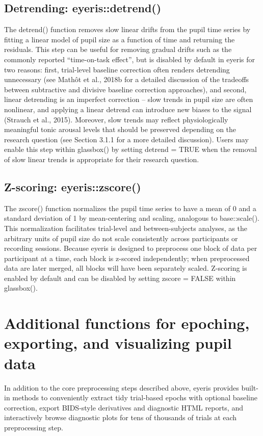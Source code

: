 \subsection{Detrending: eyeris::detrend()}
The detrend() function removes slow linear drifts from the pupil time series by fitting a linear model of pupil size as a function of time and returning the residuals. This step can be useful for removing gradual drifts such as the commonly reported “time-on-task effect”, but is disabled by default in eyeris for two reasons: first, trial-level baseline correction often renders detrending unnecessary (see Mathôt et al., 2018b for a detailed discussion of the tradeoffs between subtractive and divisive baseline correction approaches), and second, linear detrending is an imperfect correction – slow trends in pupil size are often nonlinear, and applying a linear detrend can introduce new biases to the signal (Strauch et al., 2015). Moreover, slow trends may reflect physiologically meaningful tonic arousal levels that should be preserved depending on the research question (see Section 3.1.1 for a more detailed discussion). Users may enable this step within glassbox() by setting detrend = TRUE when the removal of slow linear trends is appropriate for their research question.

\subsection{Z-scoring: eyeris::zscore()}
The zscore() function normalizes the pupil time series to have a mean of 0 and a standard deviation of 1 by mean-centering and scaling, analogous to base::scale(). This normalization facilitates trial-level and between-subjects analyses, as the arbitrary units of pupil size do not scale consistently across participants or recording sessions. Because eyeris is designed to preprocess one block of data per participant at a time, each block is z-scored independently; when preprocessed data are later merged, all blocks will have been separately scaled. Z-scoring is enabled by default and can be disabled by setting zscore = FALSE within glassbox().

\section{Additional functions for epoching, exporting, and visualizing pupil data}
In addition to the core preprocessing steps described above, eyeris provides built-in methods to conveniently extract tidy trial-based epochs with optional baseline correction, export BIDS-style derivatives and diagnostic HTML reports, and interactively browse diagnostic plots for tens of thousands of trials at each preprocessing step.

